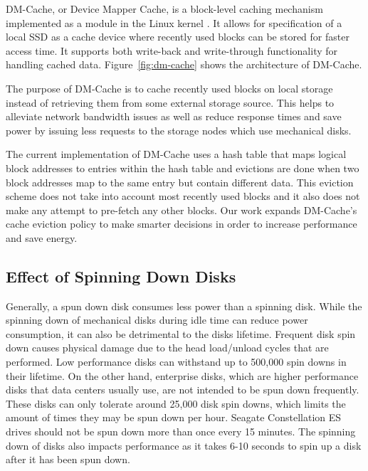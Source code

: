 DM-Cache, or Device Mapper Cache, is a block-level caching mechanism implemented
as a module in the Linux kernel \cite{DM-Cache}. It allows for specification of
a local SSD as a cache device where recently used blocks can be stored for
faster access time. It supports both write-back and write-through functionality
for handling cached data. Figure~\ref{fig:dm-cache} shows the architecture of
DM-Cache.

The purpose of DM-Cache is to cache recently used blocks on local storage
instead of retrieving them from some external storage source. This helps to
alleviate network bandwidth issues as well as reduce response times and save
power by issuing less requests to the storage nodes which use mechanical disks.

The current implementation of DM-Cache uses a hash table that maps logical block
addresses to entries within the hash table and evictions are done when two block
addresses map to the same entry but contain different data. This eviction scheme
does not take into account most recently used blocks and it also does not make
any attempt to pre-fetch any other blocks. Our work expands DM-Cache's cache
eviction policy to make smarter decisions in order to increase performance and
save energy.

\subsection{Effect of Spinning Down Disks}

Generally, a spun down disk consumes less power than a spinning disk. While the
spinning down of mechanical disks during idle time can reduce power consumption,
it can also be detrimental to the disks lifetime. Frequent disk spin down causes
physical damage due to the head load/unload cycles that are performed. Low
performance disks can withstand up to 500,000 spin downs in their lifetime. On
the other hand, enterprise disks, which are higher performance disks that data
centers usually use, are not intended to be spun down frequently. These disks
can only tolerate around 25,000 disk spin downs, which limits the amount of
times they may be spun down per hour. Seagate Constellation ES drives should not
be spun down more than once every 15 minutes.  The spinning down of disks also
impacts performance as it takes 6-10 seconds to spin up a disk after it has been
spun down.
